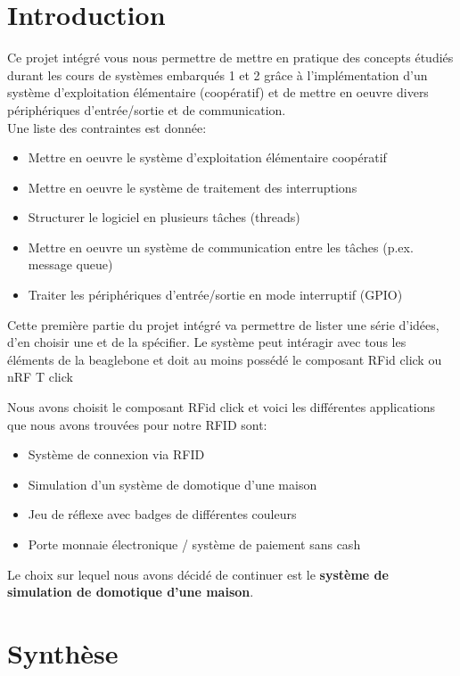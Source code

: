 \section{Introduction}
Ce projet intégré vous nous permettre de mettre en pratique des concepts étudiés durant les cours de systèmes embarqués 1 et 2 grâce à l'implémentation d'un système d'exploitation élémentaire (coopératif) et de mettre en oeuvre divers périphériques d'entrée/sortie et de communication.\\
Une liste des contraintes est donnée:
\begin{itemize}
   \item Mettre en oeuvre le système d'exploitation élémentaire coopératif
   \item Mettre en oeuvre le système de traitement des interruptions
   \item Structurer le logiciel en plusieurs tâches (threads)
   \item Mettre en oeuvre un système de communication entre les tâches (p.ex. message queue)
   \item Traiter les périphériques d'entrée/sortie en mode interruptif (GPIO)
\end{itemize}

Cette première partie du projet intégré va permettre de lister une série d'idées, d'en choisir une et de la spécifier. Le système peut intéragir avec tous les éléments de la beaglebone et doit au moins possédé le composant RFid click ou nRF T click

Nous avons choisit le composant RFid click et voici les différentes applications que nous avons trouvées pour notre RFID sont:

\begin{itemize}
    \item Système de connexion via RFID
    \item Simulation d'un système de domotique d'une maison
    \item Jeu de réflexe avec badges de différentes couleurs
    \item Porte monnaie électronique / système de paiement sans cash
\end{itemize}

Le choix sur lequel nous avons décidé de continuer est le \textbf{système de simulation de domotique d'une maison}.

\section{Synthèse}

